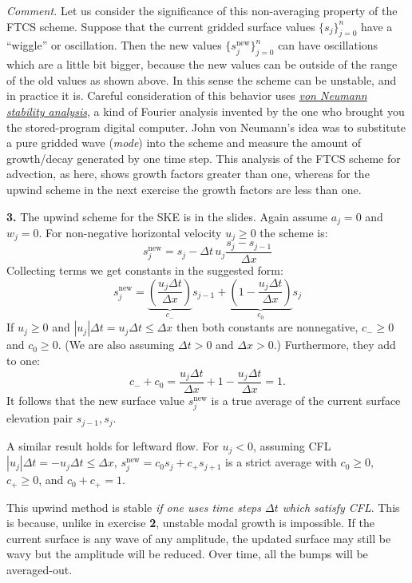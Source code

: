 \documentclass[12pt]{amsart}
\newcommand{\prob}[1]{\bigskip\noindent\textbf{#1.}\quad }
\newcommand{\snew}{s^{\text{new}}}
\begin{document}
\medskip \noindent \emph{Comment.}  Let us consider the significance of this non-averaging property of the FTCS scheme.  Suppose that the current gridded surface values $\{s_j\}_{j=0}^n$ have a ``wiggle'' or oscillation.  Then the new values $\{\snew_j\}_{j=0}^n$ can have oscillations which are a little bit bigger, because the new values can be outside of the range of the old values as shown above.  In this sense the scheme can be unstable, and in practice it is.  Careful consideration of this behavior uses \href{https://en.wikipedia.org/wiki/Von_Neumann_stability_analysis}{\emph{von Neumann stability analysis}}, a kind of Fourier analysis invented by the one who brought you the stored-program digital computer.  John von Neumann's idea was to substitute a pure gridded wave (\emph{mode}) into the scheme and measure the amount of growth/decay generated by one time step.  This analysis of the FTCS scheme for advection, as here, shows growth factors greater than one, whereas for the upwind scheme in the next exercise the growth factors are less than one.


\prob{3}  The upwind scheme for the SKE is in the slides.  Again assume $a_j=0$ and $w_j=0$.  For non-negative horizontal velocity $u_j\ge 0$ the scheme is:
    $$\snew_j = s_j - \Delta t\, u_j \frac{s_j-s_{j-1}}{\Delta x}$$
Collecting terms we get constants in the suggested form:
	$$\snew_j = \underbrace{\left(\frac{u_j \Delta t}{\Delta x}\right)}_{c_{-}} s_{j-1} + \underbrace{\left(1 - \frac{u_j \Delta t}{\Delta x}\right)}_{c_0} s_j$$
If $u_j\ge 0$ and $|u_j|\Delta t = u_j\Delta t\le \Delta x$ then both constants are nonnegative, $c_-\ge 0$ and $c_0\ge 0$.  (We are also assuming $\Delta t>0$ and $\Delta x > 0$.)  Furthermore, they add to one:
	$$c_{-} + c_0 = \frac{u_j \Delta t}{\Delta x} + 1 - \frac{u_j \Delta t}{\Delta x} = 1.$$
It follows that the new surface value $\snew_j$ is a true average of the current surface elevation pair $s_{j-1},s_j$.

A similar result holds for leftward flow.  For $u_j<0$, assuming CFL $|u_j|\Delta t = -u_j\Delta t \le \Delta x$,  $\snew_j = c_0 s_j + c_+ s_{j+1}$ is a strict average with $c_0\ge 0$, $c_+\ge 0$, and $c_0+c_+=1$.

This upwind method is stable \emph{if one uses time steps $\Delta t$ which satisfy CFL}.  This is because, unlike in exercise \textbf{2}, unstable modal growth is impossible.  If the current surface is any wave of any amplitude, the updated surface may still be wavy but the amplitude will be reduced.  Over time, all the bumps will be averaged-out.
\end{document}
